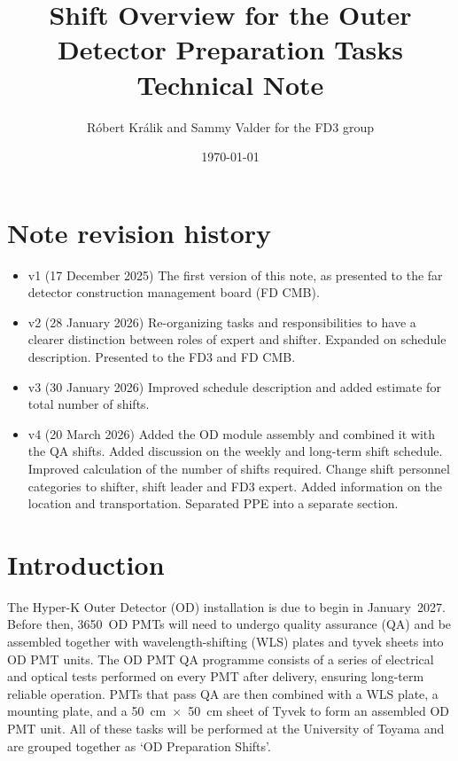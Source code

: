 \documentclass[12pt,a4paper]{article}
\author{Róbert Králik and Sammy Valder for the FD3 group}
\title{\textbf{Shift Overview for the Outer Detector Preparation Tasks\\ \vspace*{5mm}
\Large{Technical Note}}}
\date{\today}
\begin{document}
\maketitle

\tableofcontents

\vspace*{1cm}

\section*{Note revision history}
\begin{itemize}
    \item v1 (17 December 2025) The first version of this note, as presented to the far detector construction management board (FD CMB).
    \item v2 (28 January 2026) Re-organizing tasks and responsibilities to have a clearer distinction between roles of expert and shifter. Expanded on schedule description. Presented to the FD3 and FD CMB.
    \item v3 (30 January 2026) Improved schedule description and added estimate for total number of shifts.
    \item v4 (20 March 2026) Added the OD module assembly and combined it with the QA shifts. Added discussion on the weekly and long-term shift schedule. Improved calculation of the number of shifts required. Change shift personnel categories to shifter, shift leader and FD3 expert. Added information on the location and transportation. Separated PPE into a separate section.
\end{itemize}



\section{Introduction} \label{sec:intro}

The Hyper-K Outer Detector (OD) installation is due to begin in January~2027. Before then, 3650~OD PMTs will need to undergo quality assurance (QA) and be assembled together with wavelength-shifting (WLS) plates and tyvek sheets into OD PMT units. The OD PMT QA programme consists of a series of electrical and optical tests performed on every PMT after delivery, ensuring long-term reliable operation. PMTs that pass QA are then combined with a WLS plate, a mounting plate, and a 50~cm~$\times$~50~cm sheet of Tyvek to form an assembled OD PMT unit. All of these tasks will be performed at the University of Toyama and are grouped together as `OD Preparation Shifts'.
\end{document}
